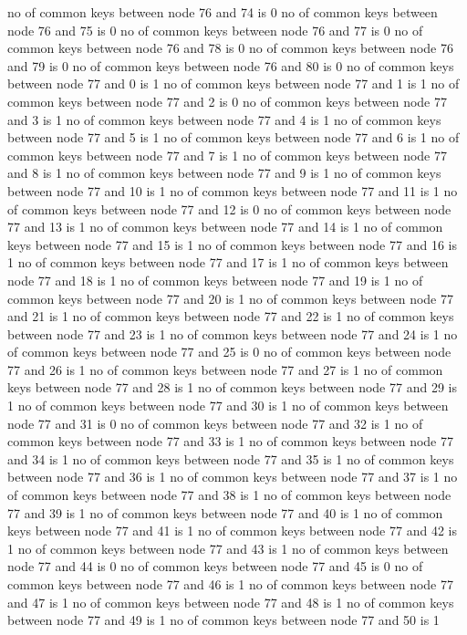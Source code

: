 no of common keys between node 76 and 74 is 0
no of common keys between node 76 and 75 is 0
no of common keys between node 76 and 77 is 0
no of common keys between node 76 and 78 is 0
no of common keys between node 76 and 79 is 0
no of common keys between node 76 and 80 is 0
no of common keys between node 77 and 0 is 1
no of common keys between node 77 and 1 is 1
no of common keys between node 77 and 2 is 0
no of common keys between node 77 and 3 is 1
no of common keys between node 77 and 4 is 1
no of common keys between node 77 and 5 is 1
no of common keys between node 77 and 6 is 1
no of common keys between node 77 and 7 is 1
no of common keys between node 77 and 8 is 1
no of common keys between node 77 and 9 is 1
no of common keys between node 77 and 10 is 1
no of common keys between node 77 and 11 is 1
no of common keys between node 77 and 12 is 0
no of common keys between node 77 and 13 is 1
no of common keys between node 77 and 14 is 1
no of common keys between node 77 and 15 is 1
no of common keys between node 77 and 16 is 1
no of common keys between node 77 and 17 is 1
no of common keys between node 77 and 18 is 1
no of common keys between node 77 and 19 is 1
no of common keys between node 77 and 20 is 1
no of common keys between node 77 and 21 is 1
no of common keys between node 77 and 22 is 1
no of common keys between node 77 and 23 is 1
no of common keys between node 77 and 24 is 1
no of common keys between node 77 and 25 is 0
no of common keys between node 77 and 26 is 1
no of common keys between node 77 and 27 is 1
no of common keys between node 77 and 28 is 1
no of common keys between node 77 and 29 is 1
no of common keys between node 77 and 30 is 1
no of common keys between node 77 and 31 is 0
no of common keys between node 77 and 32 is 1
no of common keys between node 77 and 33 is 1
no of common keys between node 77 and 34 is 1
no of common keys between node 77 and 35 is 1
no of common keys between node 77 and 36 is 1
no of common keys between node 77 and 37 is 1
no of common keys between node 77 and 38 is 1
no of common keys between node 77 and 39 is 1
no of common keys between node 77 and 40 is 1
no of common keys between node 77 and 41 is 1
no of common keys between node 77 and 42 is 1
no of common keys between node 77 and 43 is 1
no of common keys between node 77 and 44 is 0
no of common keys between node 77 and 45 is 0
no of common keys between node 77 and 46 is 1
no of common keys between node 77 and 47 is 1
no of common keys between node 77 and 48 is 1
no of common keys between node 77 and 49 is 1
no of common keys between node 77 and 50 is 1
